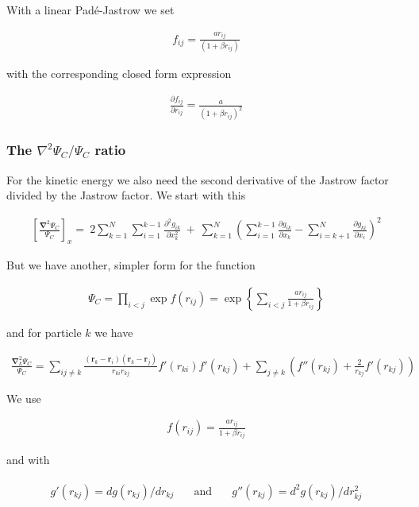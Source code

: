 \documentclass[11pt]{article}
\begin{document}
			With a linear Padé-Jastrow we set

			\begin{align}
				f_{ij}=\frac{ar_{ij}}{(1+\beta r_{ij})}
			\end{align}

			with the corresponding closed form expression

			\begin{align}
				\frac{\partial f_{ij}}{\partial r_{ij}}=\frac{a}{(1+\beta r_{ij})^{2}}
			\end{align}

		\subsubsection{The $\nabla^{2} \Psi_{C}/\Psi_{C}$ ratio}
			For the kinetic energy we also need the second derivative of the Jastrow
			factor divided by the Jastrow factor. We start with this

			\begin{align}
				\left[\frac{\mathbf{\nabla}^{2}\Psi_{C}}{\Psi_{C}}\right]_{x}=\ 2\sum_{k=1}^{N}\sum_{i=1}^{k-1}\frac{\partial^{2}g_{ik}}{\partial x_{k}^{2}}\ +\ \sum_{k=1}^{N}\left(\sum_{i=1}^{k-1}\frac{\partial g_{ik}}{\partial x_{k}}-\sum_{i=k+1}^{N}\frac{\partial g_{ki}}{\partial x_{i}}\right)^{2}
			\end{align}

			But we have another, simpler form for the function

			\begin{align}
				\Psi_{C}=\prod_{i<j}\exp f(r_{ij})=\exp\left\{ \sum_{i<j}\frac{ar_{ij}}{1+\beta r_{ij}}\right\}
			\end{align}

			and for particle $k$ we have

			\begin{align}
				\frac{\mathbf{\nabla}_{k}^{2}\Psi_{C}}{\Psi_{C}}=\sum_{ij\ne k}\frac{(\mathbf{r}_{k}-\mathbf{r}_{i})(\mathbf{r}_{k}-\mathbf{r}_{j})}{r_{ki}r_{kj}}f'(r_{ki})f'(r_{kj})+\sum_{j\ne k}\left(f''(r_{kj})+\frac{2}{r_{kj}}f'(r_{kj})\right)
			\end{align}

			We use

			\begin{align}
				f(r_{ij})=\frac{ar_{ij}}{1+\beta r_{ij}}
			\end{align}

			and with

			\begin{align}
				\begin{array}{ccc}
				g'(r_{kj})=dg(r_{kj})/dr_{kj} & \quad\mbox{and}\quad & g''(r_{kj})=d^{2}g(r_{kj})/dr_{kj}^{2}\end{array}
			\end{align}
\end{document}
